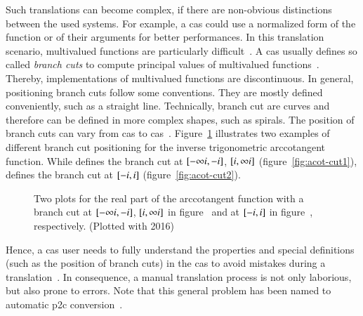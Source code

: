 Such translations can become complex, if there are non-obvious distinctions between the used systems. For example, a \gls*{cas} could use a normalized form of the function or of their arguments for better performances. In this translation scenario, multivalued functions are particularly difficult~\parencite{AISC:MultivaluedFunctions}. A \gls*{cas} usually defines so called \textit{branch cuts} to compute principal values of multivalued functions~\parencite{Maple:Cuts}. Thereby, implementations of multivalued functions are discontinuous. In general, positioning branch cuts follow some conventions. They are mostly defined conveniently, such as a straight line. Technically, branch cut are curves and therefore can be defined in more complex shapes, such as spirals. The position of branch cuts can vary from \gls*{cas} to \gls*{cas}~\parencite{Branches:acot}. Figure~\ref{fig:acot-cut-compare} illustrates two examples of different branch cut positioning for the inverse trigonometric arccotangent function. While \Maple{} defines the branch cut at ${[-\infty{i}, -{i}]}$, ${[{i},\infty{i}]}$ (figure~\ref{fig:acot-cut1}), \Mathematica{} defines the branch cut at ${[-{i}, {i}]}$ (figure~\ref{fig:acot-cut2}).

\begin{figure}[ht]
    \centering
    \hspace{0.5cm}
    \caption{Two plots for the real part of the arccotangent function with a branch cut at $[-\infty{i}, -{i}]$, $[{i},\infty{i}]$ in figure~\protect{} and at $[-{i}, {i}]$ in figure~\protect{}, respectively. (Plotted with \Maple{} 2016)}
    \label{fig:acot-cut-compare}
\end{figure}

Hence, a \gls*{cas} user needs to fully understand the properties and special definitions (such as the position of branch cuts) in the \gls*{cas} to avoid mistakes during a translation~\parencite{Maple:Cuts}. In consequence, a manual translation process is not only laborious, but also prone to errors. Note that this general problem has been named to automatic \gls*{p2c} conversion~\parencite{POM-Tagger}.

